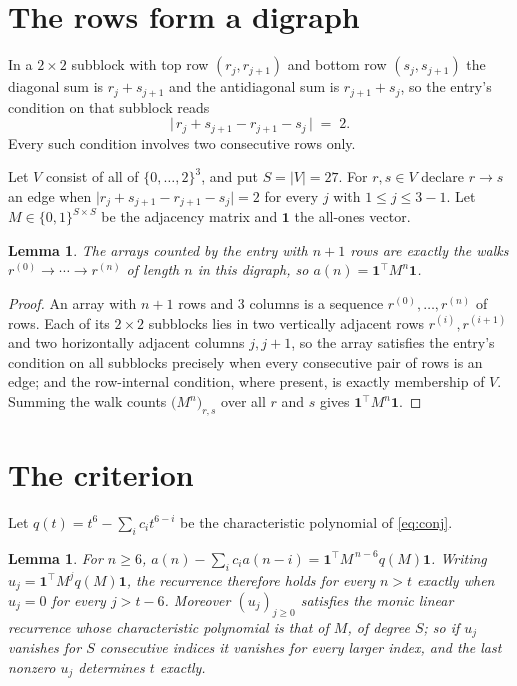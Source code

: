 \documentclass[11pt,a4paper]{article}
\theoremstyle{plain}
\newtheorem{lemma}[theorem]{Lemma}
\theoremstyle{definition}
\begin{document}
\section{The rows form a digraph}

In a $2\times2$ subblock with top row $(r_j,r_{j+1})$ and bottom row $(s_j,s_{j+1})$ the
diagonal sum is $r_j+s_{j+1}$ and the antidiagonal sum is $r_{j+1}+s_j$, so the entry's
condition on that subblock reads
\[
\bigl|\,r_j+s_{j+1}-r_{j+1}-s_j\,\bigr|\;=\;2.
\]
Every such condition involves two consecutive rows only.

Let $V$ consist of all of $\{0,\dots,2\}^{3}$, and put $S=|V|=27$. For $r,s\in V$ declare $r\to s$ an edge
when $\bigl|r_j+s_{j+1}-r_{j+1}-s_j\bigr|=2$ for every $j$ with
$1\le j\le3-1$. Let $M\in\{0,1\}^{S\times S}$ be the adjacency matrix and $\mathbf{1}$
the all-ones vector.

\begin{lemma}\label{lem:walk}
The arrays counted by the entry with $n+1$ rows are exactly the walks
$r^{(0)}\to\cdots\to r^{(n)}$ of length $n$ in this digraph, so
$a(n)=\mathbf{1}^{\!\top}M^{n}\mathbf{1}$.
\end{lemma}

\begin{proof}
An array with $n+1$ rows and $3$ columns is a sequence $r^{(0)},\dots,r^{(n)}$ of
rows. Each of its $2\times2$ subblocks lies in two vertically adjacent rows
$r^{(i)},r^{(i+1)}$ and two horizontally adjacent columns $j,j+1$, so the array satisfies
the entry's condition on all subblocks precisely when every consecutive pair of rows is an
edge; and the row-internal condition, where present, is exactly membership of $V$. Summing
the walk counts $\bigl(M^{n}\bigr)_{r,s}$ over all $r$ and $s$ gives
$\mathbf{1}^{\!\top}M^{n}\mathbf{1}$.
\end{proof}

\section{The criterion}

Let $q(t)=t^{6}-\sum_i c_i t^{6-i}$ be the characteristic polynomial of
\eqref{eq:conj}.

\begin{lemma}\label{lem:crit}
For $n\ge6$,
$a(n)-\sum_i c_i a(n-i)=\mathbf{1}^{\!\top}M^{\,n-6}q(M)\mathbf{1}$. Writing
$u_j=\mathbf{1}^{\!\top}M^{j}q(M)\mathbf{1}$, the recurrence therefore holds for every
$n>t$ exactly when $u_j=0$ for every $j>t-6$. Moreover $(u_j)_{j\ge0}$ satisfies the
monic linear recurrence whose characteristic polynomial is that of $M$, of degree $S$; so
if $u_j$ vanishes for $S$ consecutive indices it vanishes for every larger index, and the
last nonzero $u_j$ determines $t$ exactly.
\end{lemma}
\end{document}
